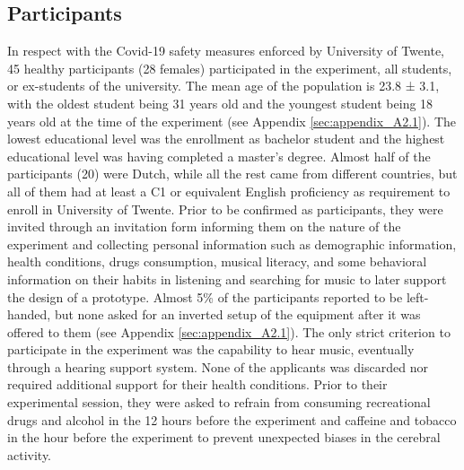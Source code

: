 \subsection{Participants}
\label{sec:participants}
In respect with the Covid-19 safety measures enforced by University of Twente, 45 healthy participants (28 females) participated in the experiment, all students, or ex-students of the university. The mean age of the population is 23.8 ± 3.1, with the oldest student being 31 years old and the youngest student being 18 years old at the time of the experiment (see Appendix \ref{sec:appendix_A2.1}). The lowest educational level was the enrollment as bachelor student and the highest educational level was having completed a master’s degree. Almost half of the participants (20) were Dutch, while all the rest came from different countries, but all of them had at least a C1 or equivalent English proficiency as requirement to enroll in University of Twente. Prior to be confirmed as participants, they were invited through an invitation form informing them on the nature of the experiment and collecting personal information such as demographic information, health conditions, drugs consumption, musical literacy, and some behavioral information on their habits in listening and searching for music to later support the design of a prototype. Almost 5\% of the participants reported to be left-handed, but none asked for an inverted setup of the equipment after it was offered to them (see Appendix \ref{sec:appendix_A2.1}). The only strict criterion to participate in the experiment was the capability to hear music, eventually through a hearing support system. None of the applicants was discarded nor required additional support for their health conditions. Prior to their experimental session, they were asked to refrain from consuming recreational drugs and alcohol in the 12 hours before the experiment and caffeine and tobacco in the hour before the experiment to prevent unexpected biases in the cerebral activity.

